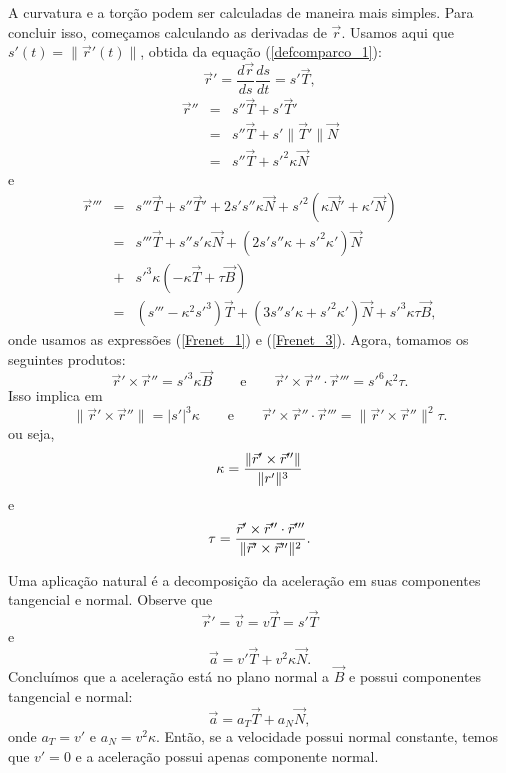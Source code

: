 A curvatura e a torção podem ser calculadas de maneira mais simples. Para concluir isso, começamos calculando as derivadas de $\vec{r}$. Usamos aqui que $s'(t)=\|\vec{r}'(t)\|$, obtida da equação (\ref{defcomparco_1}):
$$
\vec{r}'=\frac{d\vec{r}}{ds}\frac{ds}{dt}=s' \vec{T},
$$
\begin{eqnarray*}
\vec{r}''&=&s'' \vec{T}+s' \vec{T}'\\&=&s'' \vec{T}+s' \|\vec{T}'\|\vec{N}\\
&=&s'' \vec{T}+s'^2 \kappa \vec{N}
\end{eqnarray*}
e
\begin{eqnarray*}
\vec{r}'''&=&s''' \vec{T}+s''\vec{T}'+2s's''\kappa \vec{N}+s'^2 \left(\kappa \vec{N}'+\kappa' \vec{N}\right)\\
&=&s''' \vec{T}+s''s'\kappa \vec{N}+\left(2s's''\kappa+s'^2\kappa'\right) \vec{N}\\
&+&s'^3 \kappa (-\kappa \vec{T}+\tau\vec{B})\\
&=&\left(s'''-\kappa^2s'^3\right) \vec{T}+\left(3s''s'\kappa +s'^2\kappa'\right)\vec{N}+s'^3 \kappa \tau\vec{B},
\end{eqnarray*}
onde usamos as expressões (\ref{Frenet_1}) e (\ref{Frenet_3}). Agora, tomamos os seguintes produtos:
$$
\vec{r}'\times \vec{r}''=s'^3\kappa \vec{B}\qquad\text{e}\qquad
\vec{r}'\times \vec{r}''\cdot \vec{r}'''=s'^6\kappa^2\tau.
$$
Isso implica em 
$$
\|\vec{r}'\times \vec{r}''\|=|s'|^3\kappa\qquad\text{e}\qquad
\vec{r}'\times \vec{r}''\cdot \vec{r}'''=\|\vec{r}'\times \vec{r}''\|^2\tau.
$$
ou seja,
\begin{equation}{\label{curvatura_2}}
\kappa =\frac{\|\vec{r}'\times \vec{r}''\|}{\|r'\|^3}
\end{equation}
e
\begin{equation}{\label{torcao_2}}
\tau=\frac{\vec{r}'\times \vec{r}''\cdot \vec{r}'''}{\|\vec{r}'\times \vec{r}''\|^2}.
\end{equation}

\begin{obs}Uma aplicação natural é a decomposição da aceleração em suas componentes tangencial e normal. Observe que
$$
\vec{r}'=\vec{v}=v\vec{T}=s' \vec{T}
$$
e
$$
\vec{a}=v' \vec{T}+v^2 \kappa \vec{N}.
$$
Concluímos que a aceleração está no plano normal a $\vec{B}$ e possui componentes tangencial e normal:
$$
\vec{a}=a_T \vec{T}+a_N \vec{N},
$$
onde $a_T=v'$ e $a_N=v^2\kappa$. Então, se a velocidade possui normal constante, temos que $v'=0$ e a aceleração possui apenas componente normal.

\end{obs}



